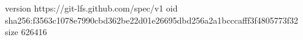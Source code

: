 version https://git-lfs.github.com/spec/v1
oid sha256:f3563c1078e7990cbd362be22d01e26695dbd256a2a1bcccafff3f4805773f32
size 626416
